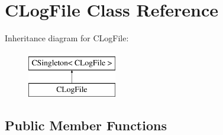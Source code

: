 \hypertarget{class_c_log_file}{
\section{CLogFile Class Reference}
\label{class_c_log_file}
}
Inheritance diagram for CLogFile:\begin{figure}[H]
\begin{center}
\leavevmode
\includegraphics[height=2cm]{class_c_log_file}
\end{center}
\end{figure}
\subsection*{Public Member Functions}
